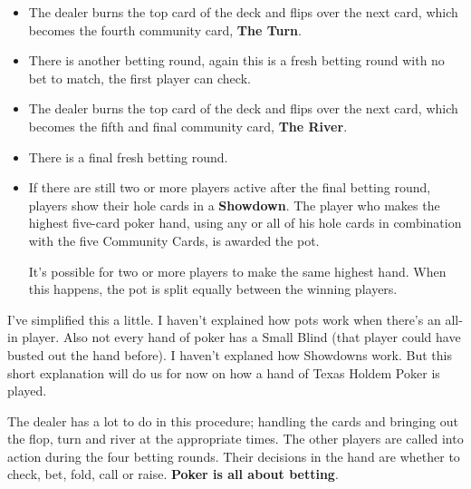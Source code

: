 \begin{itemize}
\item The dealer burns the top card of the deck and flips over the
  next card, which becomes the fourth community card, \textbf{The
    Turn}.

\item There is another betting round, again this is a fresh betting
  round with no bet to match, the first player can check.

\item The dealer burns the top card of the deck and flips over the
  next card, which becomes the fifth and final community card, \textbf{The
    River}.

\item There is a final fresh betting round.

\item If there are still two or more players active after the final
  betting round, players show their hole cards in a \textbf{Showdown}.
  The player who makes the highest five-card poker hand, using any or
  all of his hole cards in combination with the five Community Cards,
  is awarded the pot.

  It's possible for two or more players to make the same highest
  hand. When this happens, the pot is split equally between the
  winning players.

\end{itemize}

I've simplified this a little. I haven't explained how pots work when
there's an all-in player. Also not every hand of poker has a Small Blind
(that player could have busted out the hand before). I haven't
explaned how Showdowns work. But this short explanation will do us for
now on how a hand of Texas Holdem Poker is played.

The dealer has a lot to do in this procedure; handling the cards and
bringing out the flop, turn and river at the appropriate times. The
other players are called into action during the four betting
rounds. Their decisions in the hand are whether to check, bet, fold,
call or raise. \textbf{Poker is all about betting}.
